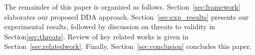 


The remainder of this paper is organized as follows. Section~\ref{sec:framework} elaborates our proposed DDA approach. Section~\ref{sec:exp_results} presents our experimental results, followed by discussion on threats to validity in Section\ref{sec:threats}. Review of key related works is given in Section~\ref{sec:relatedwork}. Finally, Section~\ref{sec:conclusion} concludes this paper.


